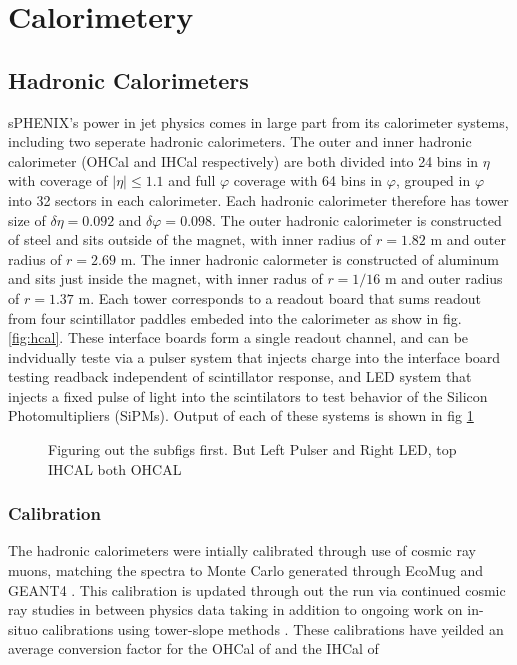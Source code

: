 \documentclass[letterpaper, 12pt, oneside]{book}
\theoremstyle{definition}
\begin{document}
\section{Calorimetery}
	\subsection{Hadronic Calorimeters}
		sPHENIX's power in jet physics comes in large part from its calorimeter systems, including two seperate hadronic calorimeters. 
		The outer and inner hadronic calorimeter (OHCal and IHCal respectively) are both divided into 24 bins in $\eta$ with coverage of $|\eta| \leq 1.1$  and full $\varphi$ coverage with 64 bins in $\varphi$, grouped in $\varphi$ into 32 sectors in each calorimeter. 
		Each hadronic calorimeter therefore has tower size of $\delta \eta = 0.092$ and $\delta \varphi=0.098$.  
		The outer hadronic calorimeter is constructed of steel and sits outside of the magnet, with inner radius of $r=1.82$ m and outer radius of $r=2.69$ m. 
		The inner hadronic calormeter is constructed of aluminum and sits just inside the magnet, with inner radus of $r=1/16$ m and outer radius of $r=1.37$ m. 
		Each tower corresponds to a readout board that sums readout from four scintillator paddles embeded into the calorimeter as show in fig. \ref{fig:hcal}. 
		These interface boards form a single readout channel, and can be indvidually teste via a pulser system that injects charge into the interface board testing readback independent of scintillator response, and LED system that injects a fixed pulse of light into the scintilators to test behavior of the Silicon Photomultipliers (SiPMs). 
		Output of each of these systems is shown in fig \ref{fig:hcal_tests}
		\begin{figure}
			\caption{Figuring out the subfigs first. But Left Pulser and Right LED, top IHCAL both OHCAL}
			\label{fig:hcal_tests}
		\end{figure}
		\subsubsection{Calibration}
			The hadronic calorimeters were intially calibrated through use of cosmic ray muons, matching the spectra to Monte Carlo 
			generated through EcoMug and GEANT4 \cite{HCal_Calib}. 
			This calibration is updated through out the run via continued cosmic ray studies in between physics data taking in addition
			to ongoing work on in-situo calibrations using tower-slope methods \cite{tower_slope_hcal}. 
			These calibrations have yeilded an average conversion factor for the OHCal of and the IHCal of %
\end{document}
